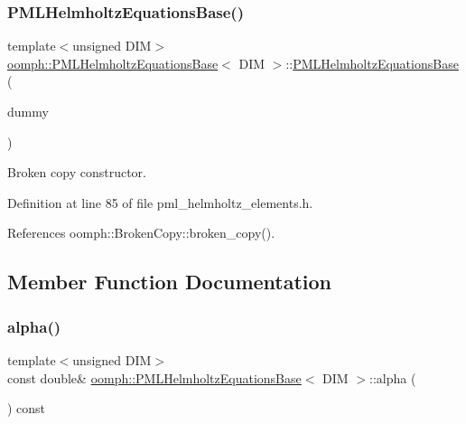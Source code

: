 \subsubsection{\texorpdfstring{P\+M\+L\+Helmholtz\+Equations\+Base()}{PMLHelmholtzEquationsBase()}\hspace{0.1cm}{\footnotesize\ttfamily [2/2]}}
{\footnotesize\ttfamily template$<$unsigned D\+IM$>$ \\
\hyperlink{classoomph_1_1PMLHelmholtzEquationsBase}{oomph\+::\+P\+M\+L\+Helmholtz\+Equations\+Base}$<$ D\+IM $>$\+::\hyperlink{classoomph_1_1PMLHelmholtzEquationsBase}{P\+M\+L\+Helmholtz\+Equations\+Base} (\begin{DoxyParamCaption}\item[{const \hyperlink{classoomph_1_1PMLHelmholtzEquationsBase}{P\+M\+L\+Helmholtz\+Equations\+Base}$<$ D\+IM $>$ \&}]{dummy }\end{DoxyParamCaption})\hspace{0.3cm}{\ttfamily [inline]}}



Broken copy constructor. 



Definition at line 85 of file pml\+\_\+helmholtz\+\_\+elements.\+h.



References oomph\+::\+Broken\+Copy\+::broken\+\_\+copy().



\subsection{Member Function Documentation}
\mbox{\label{classoomph_1_1PMLHelmholtzEquationsBase_a1d829e0491550007a0474c639dea34ba}} 
\subsubsection{\texorpdfstring{alpha()}{alpha()}}
{\footnotesize\ttfamily template$<$unsigned D\+IM$>$ \\
const double\& \hyperlink{classoomph_1_1PMLHelmholtzEquationsBase}{oomph\+::\+P\+M\+L\+Helmholtz\+Equations\+Base}$<$ D\+IM $>$\+::alpha (\begin{DoxyParamCaption}{ }\end{DoxyParamCaption}) const\hspace{0.3cm}{\ttfamily [inline]}}



